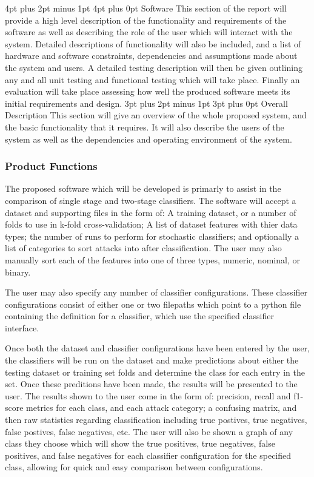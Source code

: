 \documentclass[12pt,a4paper]{article}
\makeatletter
\renewcommand\subsection{\@startsection {subsection}{1}{2mm} %
      {3pt plus 2pt minus 1pt} %
      {3pt plus 0pt} %
      {\normalfont\bfseries}}
\renewcommand\section{\@startsection {section}{1}{0mm} %
      {4pt plus 2pt minus 1pt} %
      {4pt plus 0pt} %
      {\bfseries}}
\makeatother
\begin{document}
\section{Software}
This section of the report will provide a high level description of the functionality and requirements of the software as well as describing the role of the user which will interact with the system. Detailed descriptions of functionality will also be included, and a list of hardware and software constraints, dependencies and assumptions made about the system and users. A detailed testing description will then be given outlining any and all unit testing and functional testing which will take place. Finally an evaluation will take place assessing how well the produced software meets its initial requirements and design.
\subsection{Overall Description}
This section will give an overview of the whole proposed system, and the basic functionality that it requires. It will also describe the users of the system as well as the dependencies and operating environment of the system.
\subsubsection{Product Functions}
The proposed software which will be developed is primarly to assist in the comparison of single stage and two-stage classifiers. The software will accept a dataset and supporting files in the form of: A training dataset, or a number of folds to use in k-fold cross-validation; A list of dataset features with thier data types; the number of runs to perform for stochastic classifiers; and optionally a list of categories to sort attacks into after classification. The user may also manually sort each of the features into one of three types, numeric, nominal, or binary. 

The user may also specify any number of classifier configurations. These classifier configurations consist of either one or two filepaths which point to a python file containing the definition for a classifier, which use the specified classifier interface. 

Once both the dataset and classifier configurations have been entered by the user, the classifiers will be run on the dataset and make predictions about either the testing dataset or training set folds and determine the class for each entry in the set. Once these preditions have been made, the results will be presented to the user. The results shown to the user come in the form of: precision, recall and f1-score metrics for each class, and each attack category; a confusing matrix, and then raw statistics regarding classification including true postives, true negatives, false postives, false negatives, etc. The user will also be shown a graph of any class they choose which will show the true positives, true negatives, false positives, and false negatives for each classifier configuration for the specified class, allowing for quick and easy comparison between configurations.
\end{document}

